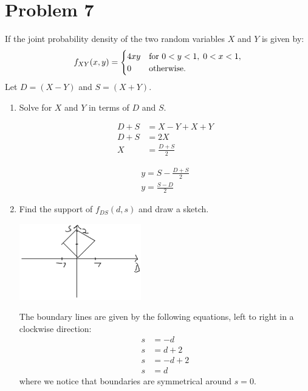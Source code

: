 \documentclass{article}
\newcommand{\1}{\mathbf{1}}
\begin{document}
\newpage
\section*{Problem 7} 
If the joint probability density of the two random variables $X$ and $Y$ is given by:
$$ f_{XY}(x,y) = \begin{cases}
    4xy & \hbox{for } 0 < y<1,\; 0<x <1,\\
    0 & \hbox{otherwise.}
    \end{cases}$$
Let $D=(X-Y)$ and $S=(X+Y)$.  

\begin{enumerate}
    \item Solve for $X$  and $Y$ in terms of $D$ and $S$.

    \begin{align*}
        D + S &= X - Y + X + Y \\
        D + S &= 2X \\
        X &= \frac{D + S}{2}
    \end{align*}

    \begin{align*} 
        y = S - \frac{D + S}{2} \\
        y = \frac{S - D}{2}
    \end{align*}

    \item Find the support of $f_{DS}(d,s)$ and draw a sketch.
    
    \begin{center}
    \includegraphics[width=200px]{STATS509/HW4/HW4Figures/picasso4aa.png}
    \end{center}
    
    The boundary lines are given by the following equations, left to right in a clockwise direction:
    \begin{align*}
        s &= -d \\
        s &= d+2 \\
        s &= -d+2 \\
        s &= d
    \end{align*}
    where we notice that boundaries are symmetrical around $s=0$. 
    

\end{enumerate}
\end{document}

